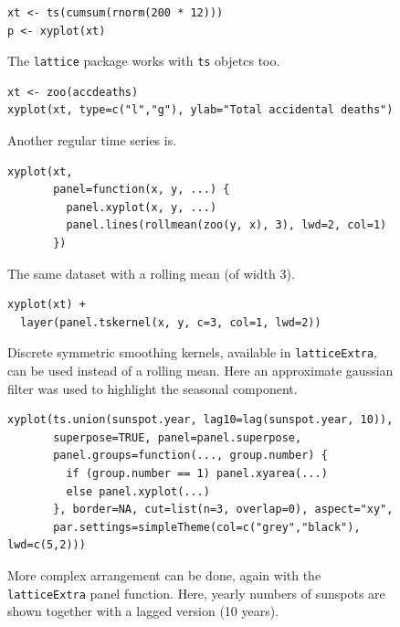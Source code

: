 \documentclass[a4paper,twoside]{book}
\newcounter{fig}
\newcommand{\img}[1]{\texttt{[image: \#1]}\stepcounter{fig}}
\renewcommand{\texttt}[1]{\lstinline{#1}}
\begin{document}
\begin{figure}[H]
\begin{lstlisting}
xt <- ts(cumsum(rnorm(200 * 12)))
p <- xyplot(xt)
\end{lstlisting}
  \fcapside[\FBwidth] {\img{figs_lattice-crop}}
  {\caption*{The \texttt{lattice} package works with \texttt{ts}
      objetcs too.}}
\end{figure}

\begin{figure}[H]
\begin{lstlisting}
xt <- zoo(accdeaths)
xyplot(xt, type=c("l","g"), ylab="Total accidental deaths")
\end{lstlisting}
  \fcapside[\FBwidth] {\img{figs_lattice-crop}}
  {\caption*{
      Another regular time series is.}}
\end{figure}

\begin{figure}[H]
\begin{lstlisting}
xyplot(xt,
       panel=function(x, y, ...) {
         panel.xyplot(x, y, ...)
         panel.lines(rollmean(zoo(y, x), 3), lwd=2, col=1)
       })
\end{lstlisting}
  \fcapside[\FBwidth] {\img{figs_lattice-crop}}
  {\caption*{The same dataset with a rolling mean (of width 3).}}
\end{figure}

\begin{figure}[H]
\begin{lstlisting}
xyplot(xt) +
  layer(panel.tskernel(x, y, c=3, col=1, lwd=2))
\end{lstlisting}
  \fcapside[\FBwidth] {\img{figs_lattice-crop}}
  {\caption*{Discrete symmetric smoothing kernels, available in
      \texttt{latticeExtra}, can be used instead of a rolling
      mean. Here an approximate gaussian filter was used to highlight
      the seasonal component.}}
\end{figure}

\begin{figure}[H]
\begin{lstlisting}
xyplot(ts.union(sunspot.year, lag10=lag(sunspot.year, 10)), 
       superpose=TRUE, panel=panel.superpose,
       panel.groups=function(..., group.number) {
         if (group.number == 1) panel.xyarea(...)
         else panel.xyplot(...)
       }, border=NA, cut=list(n=3, overlap=0), aspect="xy",
       par.settings=simpleTheme(col=c("grey","black"), lwd=c(5,2)))
\end{lstlisting}
  \fcapside[\FBwidth] {\img{figs_lattice-crop}}
  {\caption*{ More complex arrangement can be done,
      again with the \texttt{latticeExtra} panel function. Here,
      yearly numbers of sunspots are shown together with a lagged
      version (10 years).}}
\end{figure}
\end{document}
